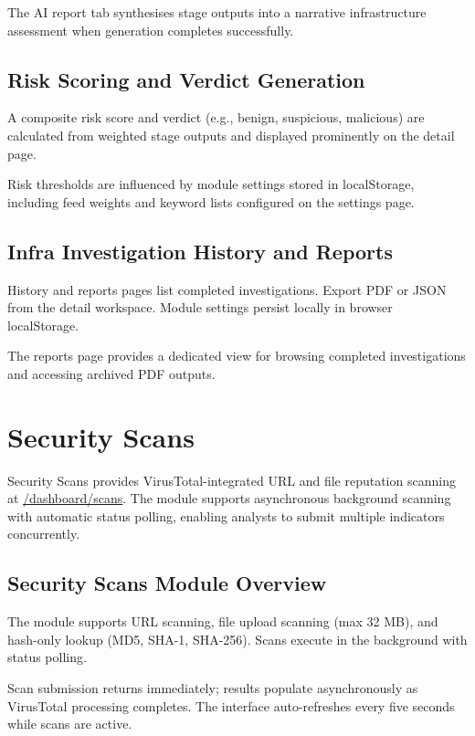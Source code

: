 The AI report tab synthesises stage outputs into a narrative infrastructure assessment when generation completes successfully.

\subsection{Risk Scoring and Verdict Generation}

A composite risk score and verdict (e.g., benign, suspicious, malicious) are calculated from weighted stage outputs and displayed prominently on the detail page.

Risk thresholds are influenced by module settings stored in localStorage, including feed weights and keyword lists configured on the settings page.

\subsection{Infra Investigation History and Reports}

History and reports pages list completed investigations. Export PDF or JSON from the detail workspace. Module settings persist locally in browser localStorage.

The reports page provides a dedicated view for browsing completed investigations and accessing archived PDF outputs.

\section{Security Scans}

Security Scans provides VirusTotal-integrated URL and file reputation scanning at \url{/dashboard/scans}. The module supports asynchronous background scanning with automatic status polling, enabling analysts to submit multiple indicators concurrently.

\subsection{Security Scans Module Overview}

The module supports URL scanning, file upload scanning (max 32 MB), and hash-only lookup (MD5, SHA-1, SHA-256). Scans execute in the background with status polling.

Scan submission returns immediately; results populate asynchronously as VirusTotal processing completes. The interface auto-refreshes every five seconds while scans are active.

